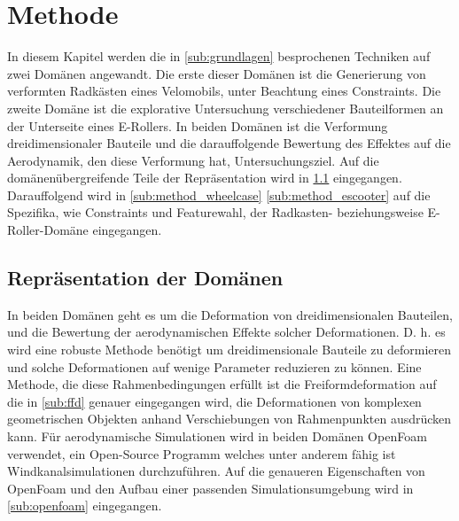 \newpage

\section{Methode}

In diesem Kapitel werden die in \ref{sub:grundlagen} besprochenen Techniken auf zwei Domänen angewandt.
Die erste dieser Domänen ist die Generierung von verformten Radkästen eines Velomobils, unter Beachtung eines Constraints.
Die zweite Domäne ist die explorative Untersuchung verschiedener Bauteilformen an der Unterseite eines E-Rollers.
In beiden Domänen ist die Verformung dreidimensionaler Bauteile und die darauffolgende Bewertung des Effektes auf die Aerodynamik, den diese Verformung hat, Untersuchungsziel.
Auf die domänenübergreifende Teile der Repräsentation wird in \ref{sub:representation} eingegangen.
Darauffolgend wird in \ref{sub:method_wheelcase} \ref{sub:method_escooter} auf die Spezifika, wie Constraints und Featurewahl, der Radkasten- beziehungsweise E-Roller-Domäne eingegangen.

\subsection{Repräsentation der Domänen}
\label{sub:representation}

In beiden Domänen geht es um die Deformation von dreidimensionalen Bauteilen, und die Bewertung der aerodynamischen Effekte solcher Deformationen.
D. h. es wird eine robuste Methode benötigt um dreidimensionale Bauteile zu deformieren und solche Deformationen auf wenige Parameter reduzieren zu können.
Eine Methode, die diese Rahmenbedingungen erfüllt ist die Freiformdeformation \cite{Sederberg.1986} auf die in \ref{sub:ffd} genauer eingegangen wird, die Deformationen von komplexen geometrischen Objekten anhand Verschiebungen von Rahmenpunkten ausdrücken kann.
Für aerodynamische Simulationen wird in beiden Domänen OpenFoam verwendet, ein Open-Source Programm welches unter anderem fähig ist Windkanalsimulationen durchzuführen.
Auf die genaueren Eigenschaften von OpenFoam und den Aufbau einer passenden Simulationsumgebung wird in \ref{sub:openfoam} eingegangen.

